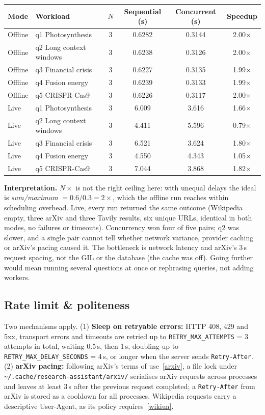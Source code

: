 \documentclass[11pt,a4paper]{article}
\newcommand{\cmd}[1]{\texttt{#1}}
\begin{document}
\begin{center}\small
\begin{tabular}{llcccc}
\toprule
\textbf{Mode} & \textbf{Workload} & $N$ & \textbf{Sequential (s)} & \textbf{Concurrent (s)} & \textbf{Speedup} \\
\midrule
Offline & q1 Photosynthesis & 3 & 0.6282 & 0.3144 & 2.00$\times$ \\
Offline & q2 Long context windows & 3 & 0.6238 & 0.3126 & 2.00$\times$ \\
Offline & q3 Financial crisis & 3 & 0.6227 & 0.3135 & 1.99$\times$ \\
Offline & q4 Fusion energy & 3 & 0.6239 & 0.3133 & 1.99$\times$ \\
Offline & q5 CRISPR-Cas9 & 3 & 0.6226 & 0.3117 & 2.00$\times$ \\
\midrule
Live & q1 Photosynthesis & 3 & 6.009 & 3.616 & 1.66$\times$ \\
Live & q2 Long context windows & 3 & 4.411 & 5.596 & 0.79$\times$ \\
Live & q3 Financial crisis & 3 & 6.521 & 3.624 & 1.80$\times$ \\
Live & q4 Fusion energy & 3 & 4.550 & 4.343 & 1.05$\times$ \\
Live & q5 CRISPR-Cas9 & 3 & 7.044 & 3.868 & 1.82$\times$ \\
\bottomrule
\end{tabular}
\end{center}

\textbf{Interpretation.} $N\times$ is not the right ceiling here: with unequal
delays the ideal is \emph{sum/maximum} $= 0.6/0.3 = 2\times$, which the offline
run reaches within scheduling overhead. Live, every run returned the same
outcome (Wikipedia empty, three arXiv and three Tavily results, six unique URLs,
identical in both modes, no failures or timeouts). Concurrency won four of five
pairs; q2 was slower, and a single pair cannot tell whether network variance,
provider caching or arXiv's pacing caused it. The bottleneck is network latency
and arXiv's 3\,s request spacing, not the GIL or the database (the cache was off).
Going further would mean running several questions at once or rephrasing
queries, not adding workers.

\subsection{Rate limit \& politeness}

Two mechanisms apply. (1) \textbf{Sleep on retryable errors:} HTTP 408, 429 and
5xx, transport errors and timeouts are retried up to \cmd{RETRY\_MAX\_ATTEMPTS} = 3
attempts in total, waiting 0.5\,s, then 1\,s, doubling up to
\cmd{RETRY\_MAX\_DELAY\_SECONDS} = 4\,s, or longer when the server sends
\texttt{Retry-After}. (2) \textbf{arXiv pacing:} following arXiv's terms of
use~\ref{arxiv}, a file lock under \cmd{\textasciitilde/.cache/research-assistant/arxiv/}
serialises arXiv requests across processes and leaves at least 3\,s after the
previous request completed; a \texttt{Retry-After} from arXiv is stored as a
cooldown for all processes. Wikipedia requests carry a descriptive User-Agent, as
its policy requires~\ref{wikiua}.
\end{document}
